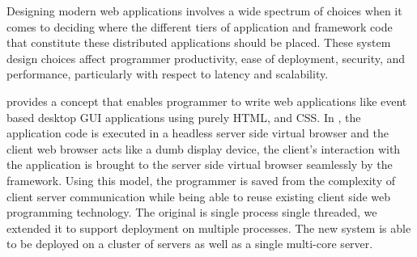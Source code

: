 \documentclass[12pt]{report}
\begin{document}
Designing modern web applications involves a wide spectrum of
choices when it comes to deciding where the different tiers of
application and framework code that constitute these distributed
applications should be placed.  These system design choices affect 
programmer productivity, ease of deployment, security, and performance, 
particularly with respect to latency and scalability.

\cb provides a concept that enables programmer to 
write web applications like event based desktop GUI applications
using purely HTML, \js and CSS.
In \cb, the application code is executed in a headless server side
virtual browser and the client web browser acts like a dumb display
device, 
the client's interaction with the application is brought to the
server side virtual browser seamlessly by the framework. 
Using this model, the programmer is saved from the complexity of
client server communication while being able to
reuse existing client side web programming technology.
The original \cb is single process single threaded,
we extended it to support deployment on multiple processes.
The new system is able to be deployed on a cluster of servers
as well as a single multi-core server.

\vfill


\pagebreak



\tableofcontents
\pagebreak

\listoffigures
\pagebreak

\listoftables
\pagebreak

\pagestyle{myheadings}











%


\end{document}
